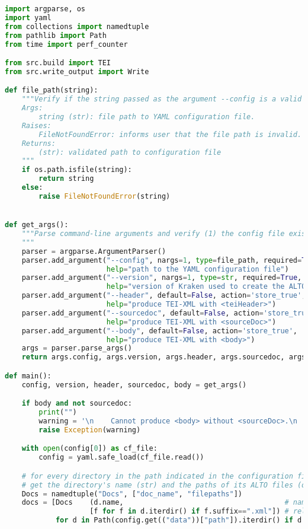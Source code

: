 \documentclass[class=article, crop=false]{standalone}
\begin{document}
\begin{lstlisting}[language=python, style=python]
import argparse, os
import yaml
from collections import namedtuple
from pathlib import Path
from time import perf_counter

from src.build import TEI
from src.write_output import Write

def file_path(string):
    """Verify if the string passed as the argument --config is a valid file path.
    Args:
        string (str): file path to YAML configuration file.
    Raises:
        FileNotFoundError: informs user that the file path is invalid.
    Returns:
        (str): validated path to configuration file
    """    
    if os.path.isfile(string):
        return string
    else:
        raise FileNotFoundError(string)


def get_args():
    """Parse command-line arguments and verify (1) the config file exist, (2) the TEI elements demanded can be constructed.
    """    
    parser = argparse.ArgumentParser()
    parser.add_argument("--config", nargs=1, type=file_path, required=True,
                        help="path to the YAML configuration file")
    parser.add_argument("--version", nargs=1, type=str, required=True,
                        help="version of Kraken used to create the ALTO-XML files")
    parser.add_argument("--header", default=False, action='store_true',
                        help="produce TEI-XML with <teiHeader>")
    parser.add_argument("--sourcedoc", default=False, action='store_true',
                        help="produce TEI-XML with <sourceDoc>")
    parser.add_argument("--body", default=False, action='store_true',
                        help="produce TEI-XML with <body>")
    args = parser.parse_args()
    return args.config, args.version, args.header, args.sourcedoc, args.body

def main():
    config, version, header, sourcedoc, body = get_args()

    if body and not sourcedoc: 
        print("")
        warning = '\n    Cannot produce <body> without <sourceDoc>.\n    To call the program with the --body option, include also the --sourcedoc option.'
        raise Exception(warning)

    with open(config[0]) as cf_file:
        config = yaml.safe_load(cf_file.read())

    # for every directory in the path indicated in the configuration file,
    # get the directory's name (str) and the paths of its ALTO files (os.path)
    Docs = namedtuple("Docs", ["doc_name", "filepaths"])
    docs = [Docs    (d.name,                                      # name of document folder
                    [f for f in d.iterdir() if f.suffix==".xml"]) # relative filepath for file
            for d in Path(config.get(("data"))["path"]).iterdir() if d.is_dir()]


\end{lstlisting}
\end{document}
